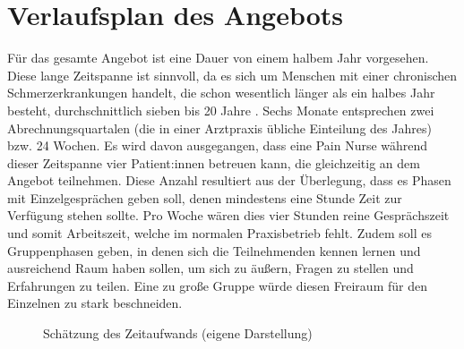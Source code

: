 \documentclass[
  twoside,
  parskip=half-,
  paper=176mm:246mm,
  BCOR=14mm,
  DIV=14,
]{scrreprt}
\begin{document}
\section{Verlaufsplan des Angebots}\label{sec:ablaufplan}
Für das gesamte Angebot ist eine Dauer von einem halbem Jahr vorgesehen. Diese lange Zeitspanne ist sinnvoll, da es sich um Menschen mit einer chronischen Schmerzerkrankungen handelt, die schon wesentlich länger als ein halbes Jahr besteht, durchschnittlich sieben bis 20 Jahre \autocite[vgl.][]{Schmerzgesellschaft}. Sechs Monate entsprechen zwei Abrechnungsquartalen (die in einer Arztpraxis übliche Einteilung des Jahres) bzw. 24 Wochen. Es wird davon ausgegangen, dass eine Pain Nurse während dieser Zeitspanne vier Patient:innen betreuen kann, die gleichzeitig an dem Angebot teilnehmen. Diese Anzahl resultiert aus der Überlegung, dass es Phasen mit Einzelgesprächen geben soll, denen mindestens eine Stunde Zeit zur Verfügung stehen sollte. Pro Woche wären dies vier Stunden reine Gesprächszeit und somit Arbeitszeit, welche im normalen Praxisbetrieb fehlt. Zudem soll es Gruppenphasen geben, in denen sich die Teilnehmenden kennen lernen und ausreichend Raum haben sollen, um sich zu äußern, Fragen zu stellen und Erfahrungen zu teilen. Eine zu große Gruppe würde diesen Freiraum für den Einzelnen zu stark beschneiden.

\begin{figure}[h!]
\centering
\small
{}
\caption{Schätzung des Zeitaufwands (eigene Darstellung)}
\label{fig:zeitaufwand}
\end{figure}
\end{document}
